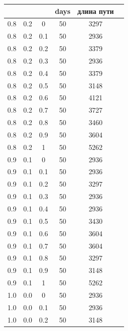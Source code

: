 \documentclass[12pt]{report}
\begin{document}
\begin{table}[!h]
	\begin{center}
		\begin{tabular}{c@{\hspace{7mm}}c@{\hspace{7mm}}c@{\hspace{7mm}}c@{\hspace{7mm}}c@{\hspace{7mm}}c}
			\toprule
			\alpha        & \beta      & \rho      &days &длина пути \\
			\midrule
			0.8     &0.2    &0      &50    &3297\\
			0.8     &0.2    &0.1    &50    &2936\\
			0.8     &0.2    &0.2    &50    &3379\\
			0.8     &0.2    &0.3    &50    &2936\\
			0.8     &0.2    &0.4    &50    &3379\\
			0.8     &0.2    &0.5    &50    &3148\\
			0.8     &0.2    &0.6    &50    &4121\\
			0.8     &0.2    &0.7    &50    &3727\\
			0.8     &0.2    &0.8    &50    &3460\\
			0.8     &0.2    &0.9    &50    &3604\\
			0.8     &0.2    &1      &50     &5262\\
			\midrule
			0.9     &0.1    &0      &50    &2936\\
			0.9     &0.1    &0.1    &50    &2936\\
			0.9     &0.1    &0.2    &50    &3297\\
			0.9     &0.1    &0.3    &50    &2936\\
			0.9     &0.1    &0.4    &50    &2936\\
			0.9     &0.1    &0.5    &50    &3430\\
			0.9     &0.1    &0.6    &50    &3604\\
			0.9     &0.1    &0.7    &50    &3604\\
			0.9     &0.1    &0.8    &50    &3297\\
			0.9     &0.1    &0.9    &50   &3148\\
			0.9     &0.1    &1      &50    &5262\\
			\midrule
			1.0     &0.0    &0      &50    &2936\\
			1.0     &0.0    &0.1    &50    &2936\\
			1.0     &0.0    &0.2    &50    &3148\\

\end{tabular}
\end{center}
\end{table}
\end{document}
